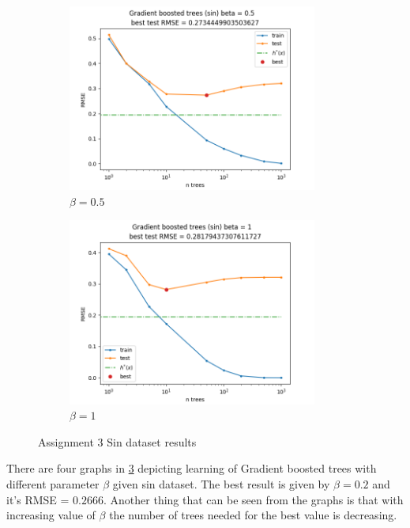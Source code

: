 \documentclass[12pt]{article}
\begin{document}
\begin{figure}[!h]
\begin{subfigure}[b]{0.49\textwidth}
        \includegraphics[width=0.9\textwidth]{plots/03/01-sin-0-5.png}
        \caption{$\beta = 0.5$}
        \label{fig:03-sin-0.5}
    \end{subfigure}
    \begin{subfigure}[b]{0.49\textwidth}
        \centering
        \includegraphics[width=0.9\textwidth]{plots/03/01-sin-1.png}
        \caption{$\beta = 1$}
        \label{fig:03-sin-1}
    \end{subfigure}
    \caption{Assignment 3 Sin dataset results}
    \label{fig:03-sin}
\end{figure}

There are four graphs in \ref{fig:03-sin} depicting learning of Gradient boosted trees with different parameter $\beta$ given sin dataset. The best result is given by $\beta = 0.2$ and it's RMSE = $0.2666$. Another thing that can be seen from the graphs is that with increasing value of $\beta$ the number of trees needed for the best value is decreasing.
\end{document}
